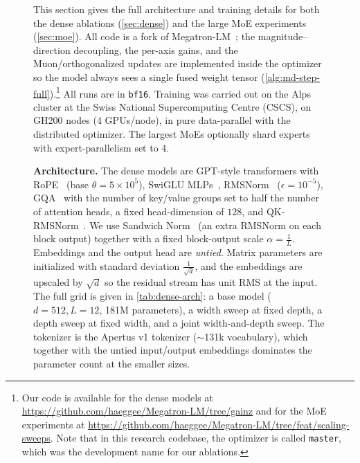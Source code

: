 \documentclass[10pt]{article} %
\makeatletter
\newif\ifanon
\newcommand{\anon}[2]{\ifanon#1\else#2\fi}
\def\subsection{\@startsection{subsection}{2}{\z@}{-1.6ex plus -0.5ex minus -.2ex}{0.5ex plus .1ex}{\normalsize\bf\raggedright\sffamily}}
\makeatother
\begin{document}
\begin{figure}[t]
This section gives the full architecture and training details for both the dense ablations (\autoref{sec:dense}) and the large MoE experiments (\autoref{sec:moe}). All code is a fork of Megatron-LM~\citep{shoeybi2019megatron}; the magnitude--direction decoupling, the per-axis gains, and the Muon/orthogonalized updates are implemented inside the optimizer so the model always sees a single fused weight tensor (\autoref{alg:md-step-full}).\anon{}{\footnote{Our code is available for the dense models at \url{https://github.com/haeggee/Megatron-LM/tree/gainz} and for the MoE experiments at \url{https://github.com/haeggee/Megatron-LM/tree/feat/scaling-sweeps}. Note that in this research codebase, the optimizer is called \texttt{master}, which was the development name for our ablations.}} All runs are in \texttt{bf16}. Training was carried out \anon{}{on the Alps cluster at the Swiss National Supercomputing Centre (CSCS), }on GH200 nodes (4 GPUs/node), in pure data-parallel with the distributed optimizer. The largest MoEs optionally shard experts with expert-parallelism set to 4.

\subsection{Dense Models}
\label{sec:appendix-setup-dense}

\textbf{Architecture.} The dense models are GPT-style transformers with RoPE~\citep{su2021roformer} (base $\theta=5\!\times\!10^5$), SwiGLU MLPs~\citep{shazeer2020glu}, RMSNorm~\citep{zhang2019rmsnorm} ($\epsilon=10^{-5}$), GQA~\citep{ainslie2023gqa} with the number of key/value groups set to half the number of attention heads, a fixed head-dimension of $128$, and QK-RMSNorm~\citep{dehghani2023scaling,wortsman2023small}. We use Sandwich Norm~\citep{ding2021cogview,kim2025peri} (an extra RMSNorm on each block output) together with a fixed block-output scale $\alpha=\frac{1}{L}$. Embeddings and the output head are \emph{untied}. Matrix parameters are initialized with standard deviation $\frac{1}{\sqrt{d}}$, and the embeddings are upscaled by $\sqrt{d}$ so the residual stream has unit RMS at the input. The full grid is given in \autoref{tab:dense-arch}: a base model ($d=512,L=12$, 181M parameters), a width sweep at fixed depth, a depth sweep at fixed width, and a joint width-and-depth sweep. The tokenizer is the Apertus v1 tokenizer ($\sim$131k vocabulary), which together with the untied input/output embeddings dominates the parameter count at the smaller sizes.


\end{figure}
\end{document}

